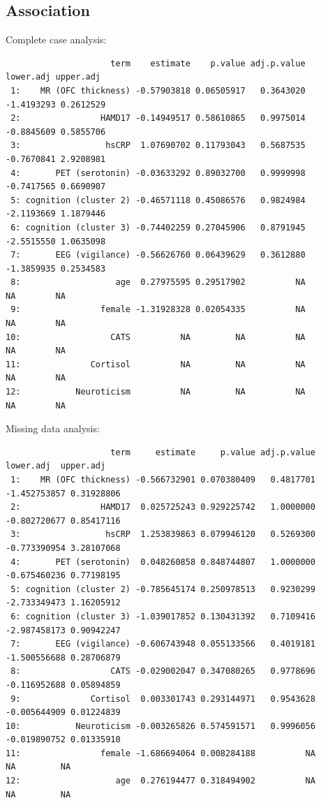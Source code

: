 \documentclass[12pt]{article}
\begin{document}
\subsection{Association}
\label{sec:orgcb8b922}
Complete case analysis:
\label{}
\begin{verbatim}
                     term    estimate    p.value adj.p.value  lower.adj upper.adj
 1:    MR (OFC thickness) -0.57903818 0.06505917   0.3643020 -1.4193293 0.2612529
 2:                HAMD17 -0.14949517 0.58610865   0.9975014 -0.8845609 0.5855706
 3:                 hsCRP  1.07690702 0.11793043   0.5687535 -0.7670841 2.9208981
 4:       PET (serotonin) -0.03633292 0.89032700   0.9999998 -0.7417565 0.6690907
 5: cognition (cluster 2) -0.46571118 0.45086576   0.9824984 -2.1193669 1.1879446
 6: cognition (cluster 3) -0.74402259 0.27045906   0.8791945 -2.5515550 1.0635098
 7:       EEG (vigilance) -0.56626760 0.06439629   0.3612880 -1.3859935 0.2534583
 8:                   age  0.27975595 0.29517902          NA         NA        NA
 9:                female -1.31928328 0.02054335          NA         NA        NA
10:                  CATS          NA         NA          NA         NA        NA
11:              Cortisol          NA         NA          NA         NA        NA
12:           Neuroticism          NA         NA          NA         NA        NA
\end{verbatim}

Missing data analysis:
\label{}
\begin{verbatim}
                     term     estimate     p.value adj.p.value    lower.adj  upper.adj
 1:    MR (OFC thickness) -0.566732901 0.070380409   0.4817701 -1.452753857 0.31928806
 2:                HAMD17  0.025725243 0.929225742   1.0000000 -0.802720677 0.85417116
 3:                 hsCRP  1.253839863 0.079946120   0.5269300 -0.773390954 3.28107068
 4:       PET (serotonin)  0.048260858 0.848744807   1.0000000 -0.675460236 0.77198195
 5: cognition (cluster 2) -0.785645174 0.250978513   0.9230299 -2.733349473 1.16205912
 6: cognition (cluster 3) -1.039017852 0.130431392   0.7109416 -2.987458173 0.90942247
 7:       EEG (vigilance) -0.606743948 0.055133566   0.4019181 -1.500556688 0.28706879
 8:                  CATS -0.029002047 0.347080265   0.9778696 -0.116952688 0.05894859
 9:              Cortisol  0.003301743 0.293144971   0.9543628 -0.005644909 0.01224839
10:           Neuroticism -0.003265826 0.574591571   0.9996056 -0.019890752 0.01335910
11:                female -1.686694064 0.008284188          NA           NA         NA
12:                   age  0.276194477 0.318494902          NA           NA         NA
\end{verbatim}
\end{document}
